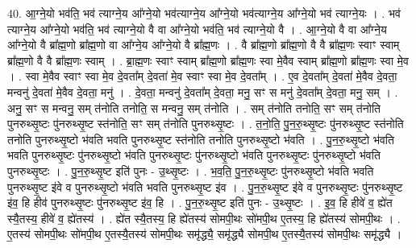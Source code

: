 \documentclass[17pt]{extarticle}
\begin{document}
40. आ॒ग्ने॒यो भव॑ति॒ भव॑ त्याग्ने॒य आ᳚ग्ने॒यो भव॑त्याग्ने॒य आ᳚ग्ने॒यो भव॑त्याग्ने॒य आ᳚ग्ने॒यो भव॑ त्याग्ने॒यः । . भव॑ त्याग्ने॒य आ᳚ग्ने॒यो भव॑ति॒ भव॑ त्याग्ने॒यो वै वा आ᳚ग्ने॒यो भव॑ति॒ भव॑ त्याग्ने॒यो वै । . आ॒ग्ने॒यो वै वा आ᳚ग्ने॒य आ᳚ग्ने॒यो वै ब्रा᳚ह्म॒णो ब्रा᳚ह्म॒णो वा आ᳚ग्ने॒य आ᳚ग्ने॒यो वै ब्रा᳚ह्म॒णः । . वै ब्रा᳚ह्म॒णो ब्रा᳚ह्म॒णो वै वै ब्रा᳚ह्म॒णः स्वाꣳ स्वाम् ब्रा᳚ह्म॒णो वै वै ब्रा᳚ह्म॒णः स्वाम् । . ब्रा॒ह्म॒णः स्वाꣳ स्वाम् ब्रा᳚ह्म॒णो ब्रा᳚ह्म॒णः स्वा मे॒वैव स्वाम् ब्रा᳚ह्म॒णो ब्रा᳚ह्म॒णः स्वा मे॒व । . स्वा मे॒वैव स्वाꣳ स्वा मे॒व दे॒वता᳚म् दे॒वता॑ मे॒व स्वाꣳ स्वा मे॒व दे॒वता᳚म् । . ए॒व दे॒वता᳚म् दे॒वता॑ मे॒वैव दे॒वता॒ मन्वनु॑ दे॒वता॑ मे॒वैव दे॒वता॒ मनु॑ । . दे॒वता॒ मन्वनु॑ दे॒वता᳚म् दे॒वता॒ मनु॒ सꣳ स मनु॑ दे॒वता᳚म् दे॒वता॒ मनु॒ सम् । . अनु॒ सꣳ स मन्वनु॒ सम् त॑नोति तनोति॒ स मन्वनु॒ सम् त॑नोति । . सम् त॑नोति तनोति॒ सꣳ सम् त॑नोति पुनरुथ्सृ॒ष्टः पु॑नरुथ्सृ॒ष्ट स्त॑नोति॒ सꣳ सम् त॑नोति पुनरुथ्सृ॒ष्टः । . त॒नो॒ति॒ पु॒न॒रु॒थ्सृ॒ष्टः पु॑नरुथ्सृ॒ष्ट स्त॑नोति तनोति पुनरुथ्सृ॒ष्टो भ॑वति भवति पुनरुथ्सृ॒ष्ट स्त॑नोति तनोति पुनरुथ्सृ॒ष्टो भ॑वति । . पु॒न॒रु॒थ्सृ॒ष्टो भ॑वति भवति पुनरुथ्सृ॒ष्टः पु॑नरुथ्सृ॒ष्टो भ॑वति पुनरुथ्सृ॒ष्टः पु॑नरुथ्सृ॒ष्टो भ॑वति पुनरुथ्सृ॒ष्टः पु॑नरुथ्सृ॒ष्टो भ॑वति पुनरुथ्सृ॒ष्टः । . पु॒न॒रु॒थ्सृ॒ष्ट इति॑ पुनः - उ॒थ्सृ॒ष्टः । . भ॒व॒ति॒ पु॒न॒रु॒थ्सृ॒ष्टः पु॑नरुथ्सृ॒ष्टो भ॑वति भवति पुनरुथ्सृ॒ष्ट इ॑वे व पुनरुथ्सृ॒ष्टो भ॑वति भवति पुनरुथ्सृ॒ष्ट इ॑व । . पु॒न॒रु॒थ्सृ॒ष्ट इ॑वे व पुनरुथ्सृ॒ष्टः पु॑नरुथ्सृ॒ष्ट इ॑व॒ हि हीव॑ पुनरुथ्सृ॒ष्टः पु॑नरुथ्सृ॒ष्ट इ॑व॒ हि । . पु॒न॒रु॒थ्सृ॒ष्ट इति॑ पुनः - उ॒थ्सृ॒ष्टः । . इ॒व॒ हि हीवे॑ व॒ ह्ये॑त स्यै॒तस्य॒ हीवे॑ व॒ ह्ये॑तस्य॑ । . ह्ये॑त स्यै॒तस्य॒ हि ह्ये॑तस्य॑ सोमपी॒थः सो॑मपी॒थ ए॒तस्य॒ हि ह्ये॑तस्य॑ सोमपी॒थः । . ए॒तस्य॑ सोमपी॒थः सो॑मपी॒थ ए॒तस्यै॒तस्य॑ सोमपी॒थः समृ॑द्ध्यै॒ समृ॑द्ध्यै सोमपी॒थ ए॒तस्यै॒तस्य॑ सोमपी॒थः समृ॑द्ध्यै । \newline
\pagebreak
{}
\end{document}
